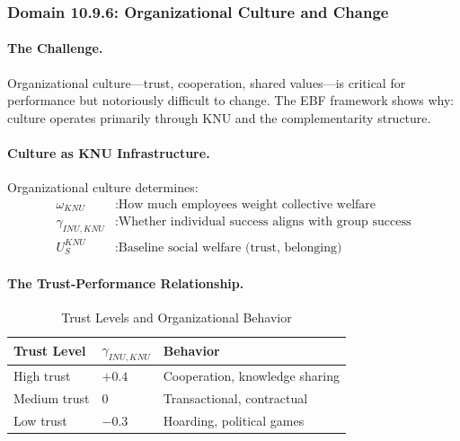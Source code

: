 \subsubsection{Domain 10.9.6: Organizational Culture and Change}
\label{subsubsec:org-culture}

\paragraph{The Challenge.}
Organizational culture---trust, cooperation, shared values---is critical for
performance but notoriously difficult to change. The EBF framework shows
why: culture operates primarily through KNU and the complementarity structure.

\paragraph{Culture as KNU Infrastructure.}
Organizational culture determines:
\begin{align}
\omega_{KNU} &: \text{How much employees weight collective welfare} \\
\gamma_{INU,KNU} &: \text{Whether individual success aligns with group success} \\
U^{KNU}_{S} &: \text{Baseline social welfare (trust, belonging)}
\end{align}

\paragraph{The Trust-Performance Relationship.}

\begin{table}[htbp]
\centering
\caption{Trust Levels and Organizational Behavior}
\label{tab:trust-levels}
\renewcommand{\arraystretch}{1.3}
\begin{tabular}{@{}lll@{}}
\toprule
\textbf{Trust Level} & \textbf{$\gamma_{INU,KNU}$} & \textbf{Behavior} \\
\midrule
High trust & $+0.4$ & Cooperation, knowledge sharing \\
Medium trust & $0$ & Transactional, contractual \\
Low trust & $-0.3$ & Hoarding, political games \\
\bottomrule
\end{tabular}
\end{table}

